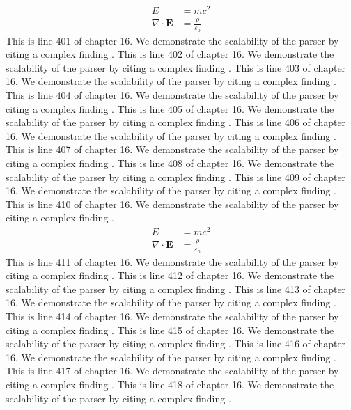 \begin{align*}
  E &= mc^2 \\
  \nabla \cdot \mathbf{E} &= \frac{\rho}{\varepsilon_0}
\end{align*}
This is line 401 of chapter 16. We demonstrate the scalability of the parser by citing a complex finding \cite{ref16_401}.
This is line 402 of chapter 16. We demonstrate the scalability of the parser by citing a complex finding \cite{ref16_402}.
This is line 403 of chapter 16. We demonstrate the scalability of the parser by citing a complex finding \cite{ref16_403}.
This is line 404 of chapter 16. We demonstrate the scalability of the parser by citing a complex finding \cite{ref16_404}.
This is line 405 of chapter 16. We demonstrate the scalability of the parser by citing a complex finding \cite{ref16_405}.
This is line 406 of chapter 16. We demonstrate the scalability of the parser by citing a complex finding \cite{ref16_406}.
This is line 407 of chapter 16. We demonstrate the scalability of the parser by citing a complex finding \cite{ref16_407}.
This is line 408 of chapter 16. We demonstrate the scalability of the parser by citing a complex finding \cite{ref16_408}.
This is line 409 of chapter 16. We demonstrate the scalability of the parser by citing a complex finding \cite{ref16_409}.
This is line 410 of chapter 16. We demonstrate the scalability of the parser by citing a complex finding \cite{ref16_410}.
\begin{align*}
  E &= mc^2 \\
  \nabla \cdot \mathbf{E} &= \frac{\rho}{\varepsilon_0}
\end{align*}
This is line 411 of chapter 16. We demonstrate the scalability of the parser by citing a complex finding \cite{ref16_411}.
This is line 412 of chapter 16. We demonstrate the scalability of the parser by citing a complex finding \cite{ref16_412}.
This is line 413 of chapter 16. We demonstrate the scalability of the parser by citing a complex finding \cite{ref16_413}.
This is line 414 of chapter 16. We demonstrate the scalability of the parser by citing a complex finding \cite{ref16_414}.
This is line 415 of chapter 16. We demonstrate the scalability of the parser by citing a complex finding \cite{ref16_415}.
This is line 416 of chapter 16. We demonstrate the scalability of the parser by citing a complex finding \cite{ref16_416}.
This is line 417 of chapter 16. We demonstrate the scalability of the parser by citing a complex finding \cite{ref16_417}.
This is line 418 of chapter 16. We demonstrate the scalability of the parser by citing a complex finding \cite{ref16_418}.
